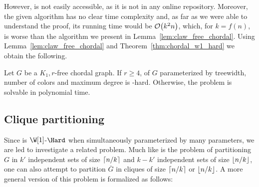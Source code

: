 However, \citep{claw_free_de_werra} is not easily accessible, as it is not in any online repository.
Moreover, the given algorithm has no clear time complexity and, as far as we were able to understand the proof, its running time would be $\mathcal{O}\!\left(k^2n\right)$, which, for $k = f(n)$, is worse than the algorithm we present in Lemma~\ref{lem:claw_free_chordal}.
Using Lemma~\ref{lem:claw_free_chordal} and Theorem~\ref{thm:chordal_w1_hard} we obtain the following.

\begin{theorem}
     Let $G$ be a $K_1,r$-free chordal graph. If $r \geq 4$,  of $G$ parameterized by treewidth, number of colors and maximum degree is \W[1]\textsf{-hard}.
     Otherwise, the problem is solvable in polynomial time.
\end{theorem}



\subsection{Clique partitioning}

Since  is $\W[1]$-$\Hard$ when simultaneously parameterized by many parameters, we are led to investigate a related problem.
Much like  is the problem of partitioning $G$ in $k'$ independent sets of size $\left\lceil n/k\right\rceil$ and $k - k'$ independent sets of size $\left\lfloor n/k\right\rfloor$, one can also attempt to partition $\overline{G}$ in cliques of size $\left\lceil n/k\right\rceil$ or $\left\lfloor n/k\right\rfloor$.
A more general version of this problem is formalized as follows:

